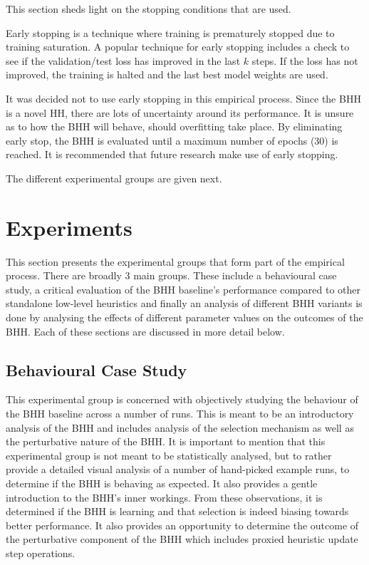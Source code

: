 This section sheds light on the stopping conditions that are used.

Early stopping is a technique where training is prematurely stopped due to training saturation. A popular technique for early stopping includes a check to see if the validation/test loss has improved in the last $k$ steps. If the loss has not improved, the training is halted and the last best model weights are used.

It was decided not to use early stopping in this empirical process. Since the \ac{BHH} is a novel \ac{HH}, there are lots of uncertainty around its performance. It is unsure as to how the \ac{BHH} will behave, should overfitting take place. By eliminating early stop, the \ac{BHH} is evaluated until a maximum number of epochs (30) is reached. It is recommended that future research make use of early stopping.

The different experimental groups are given next.







\section{Experiments}
\label{sec:methodology:experiments}

This section presents the experimental groups that form part of the empirical process. There are broadly 3 main groups. These include a behavioural case study, a critical evaluation of the \ac{BHH} baseline's performance compared to other standalone low-level heuristics and finally an analysis of different \ac{BHH} variants is done by analysing the effects of different parameter values on the outcomes of the \ac{BHH}. Each of these sections are discussed in more detail below.


\subsection{Behavioural Case Study}
\label{sec:methodology:experiments:case_study}

This experimental group is concerned with objectively studying the behaviour of the \ac{BHH} baseline across a number of runs. This is meant to be an introductory analysis of the \ac{BHH} and includes analysis of the selection mechanism as well as the perturbative nature of the \ac{BHH}. It is important to mention that this experimental group is not meant to be statistically analysed, but to rather provide a detailed visual analysis of a number of hand-picked example runs, to determine if the \ac{BHH} is behaving as expected. It also provides a gentle introduction to the \ac{BHH}'s inner workings. From these observations, it is determined if the \ac{BHH} is learning and that selection is indeed biasing towards better performance. It also provides an opportunity to determine the outcome of the perturbative component of the \ac{BHH} which includes proxied heuristic update step operations.

